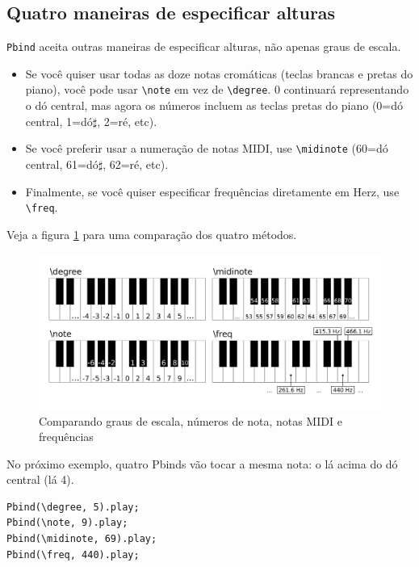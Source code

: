 \subsection{Quatro maneiras de especificar alturas}

\texttt{Pbind} aceita outras maneiras de especificar alturas, não apenas graus de escala.
\begin{itemize}
\item Se você quiser usar todas as doze notas cromáticas (teclas brancas e pretas do piano), você pode usar \texttt{\textbackslash note} em vez de \texttt{\textbackslash degree}. 0 continuará representando o dó central, mas agora os números incluem as teclas pretas do piano (0=dó central, 1=dó$\sharp$, 2=ré, etc).
\item Se você preferir usar a numeração de notas MIDI, use \texttt{\textbackslash midinote} (60=dó central, 61=dó$\sharp$, 62=ré, etc).
\item Finalmente, se você quiser especificar frequências diretamente em Herz, use \texttt{\textbackslash freq}.
\end{itemize}

Veja a figura \ref{fig:scale-degrees} para uma comparação dos quatro métodos.

\begin{figure}[h]
\centering
\includegraphics[scale=0.4]{fig-piano-keyboard-degree-note-midinote-freq.png}
\caption{Comparando graus de escala, números de nota, notas MIDI e frequências}
\label{fig:scale-degrees}
\end{figure}

No próximo exemplo, quatro Pbinds vão tocar a mesma nota: o lá acima do dó central (lá 4).

\begin{lstlisting}[style=SuperCollider-IDE, basicstyle=\scttfamily\footnotesize]
Pbind(\degree, 5).play;
Pbind(\note, 9).play;
Pbind(\midinote, 69).play;
Pbind(\freq, 440).play;
\end{lstlisting}


